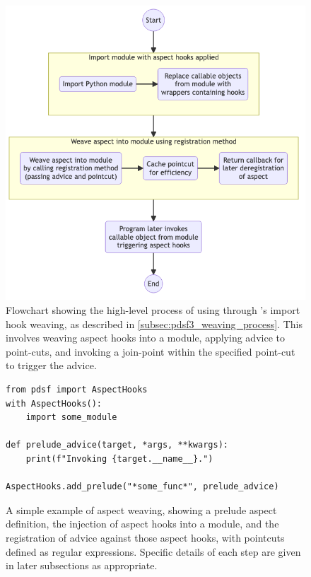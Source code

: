 \begin{figure}
  \centering
  \includegraphics[width=0.7\columnwidth]{40_pydysofu_rewrite/diagrams/aspect-hook-weaving-high-level.png}
  \caption{Flowchart showing the high-level process of using \aop{} through
  \pdsf{}'s import hook weaving, as described in
  \cref{subsec:pdsf3_weaving_process}. This involves weaving aspect hooks into a
  module, applying advice to point-cuts, and invoking a join-point within the
  specified point-cut to trigger the advice.}
  \label{fig:high-level-import-hook-weaving-steps}
\end{figure}


\begin{figure}
    \begin{lstlisting}[style=footnotesize_python]
from pdsf import AspectHooks
with AspectHooks():
    import some_module
    
def prelude_advice(target, *args, **kwargs):
    print(f"Invoking {target.__name__}.")

AspectHooks.add_prelude("*some_func*", prelude_advice)
    \end{lstlisting}
    \caption{A simple example of aspect weaving, showing a prelude aspect definition, the injection of aspect hooks into a module, and the registration of advice against those aspect hooks, with pointcuts defined as regular expressions. Specific details of each step are given in later subsections as appropriate.}
    \label{fig:simple_example_of_aspect_weaving}
\end{figure}

